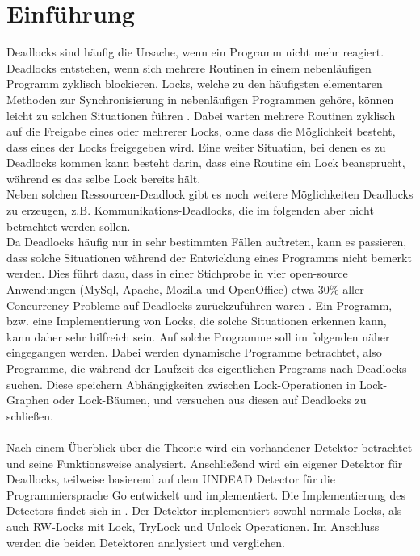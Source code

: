 \chapter{Einführung}
Deadlocks sind häufig die Ursache, wenn ein Programm nicht mehr reagiert\cite{Joshi}.
Deadlocks entstehen, wenn sich mehrere Routinen in einem nebenläufigen 
Programm zyklisch blockieren. Locks, welche zu den häufigsten elementaren 
Methoden zur Synchronisierung in nebenläufigen Programmen gehöre, können 
leicht zu solchen Situationen führen \cite{zhou}. Dabei warten mehrere Routinen 
zyklisch auf die Freigabe eines oder mehrerer Locks, ohne dass die Möglichkeit
besteht, dass eines der Locks freigegeben wird. Eine weiter Situation, 
bei denen es zu Deadlocks kommen kann besteht darin, dass eine Routine 
ein Lock beansprucht, während es das selbe Lock bereits hält.\\ 
Neben solchen Ressourcen-Deadlock gibt es noch weitere Möglichkeiten Deadlocks 
zu erzeugen, z.B. Kommunikations-Deadlocks, die im folgenden aber nicht betrachtet 
werden sollen. \\
Da Deadlocks häufig nur in sehr bestimmten Fällen auftreten, kann es passieren,
dass solche Situationen während der Entwicklung eines Programms nicht bemerkt
werden. Dies führt dazu, dass in einer Stichprobe in vier open-source Anwendungen 
(MySql, Apache, Mozilla und OpenOffice) etwa $30\%$ aller Concurrency-Probleme 
auf Deadlocks zurückzuführen waren \cite{Lu}. Ein Programm, bzw. eine Implementierung 
von Locks, die solche Situationen erkennen kann, kann daher sehr hilfreich sein.
Auf solche Programme soll im folgenden näher eingegangen werden. Dabei werden 
dynamische Programme betrachtet, also Programme, die während der Laufzeit des 
eigentlichen Programs nach Deadlocks suchen. Diese speichern Abhängigkeiten 
zwischen Lock-Operationen in Lock-Graphen oder Lock-Bäumen, und versuchen aus 
diesen auf Deadlocks zu schließen.\\\\
Nach einem Überblick über die Theorie wird ein vorhandener Detektor \cite{sasha-s}
betrachtet und seine Funktionsweise analysiert. Anschließend wird ein eigener 
Detektor für Deadlocks, teilweise basierend auf dem UNDEAD Detector \cite{zhou}
für die Programmiersprache Go entwickelt und implementiert. Die Implementierung des Detectors 
findet sich in \cite{implementation}. Der Detektor implementiert sowohl normale 
Locks, als auch RW-Locks mit Lock, TryLock und Unlock Operationen. Im Anschluss 
werden die beiden Detektoren analysiert und verglichen. 
